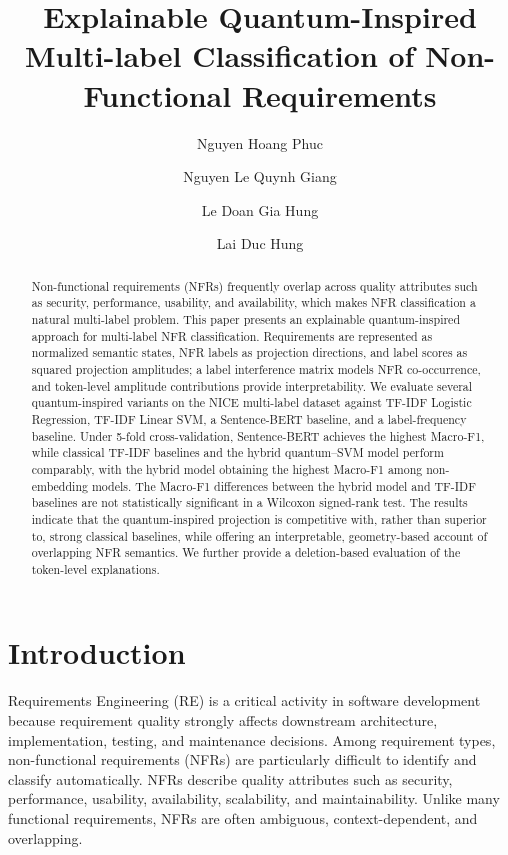 \documentclass[runningheads]{llncs}
\title{Explainable Quantum-Inspired Multi-label Classification of Non-Functional Requirements}
\author{Nguyen Hoang Phuc\inst{1} \and Nguyen Le Quynh Giang\inst{1} \and Le Doan Gia Hung\inst{1} \and Lai Duc Hung\inst{1}}
\institute{FPT University, Ho Chi Minh City, Vietnam \\
\email{nphuc4748@gmail.com, nguyengiang14012005@gmail.com, lhung291005@gmail.com, hungld@fpt.edu.vn}}
\begin{document}
\maketitle

\begin{abstract}
Non-functional requirements (NFRs) frequently overlap across quality attributes
such as security, performance, usability, and availability, which makes NFR
classification a natural multi-label problem. This paper presents an explainable
quantum-inspired approach for multi-label NFR classification. Requirements are
represented as normalized semantic states, NFR labels as projection directions,
and label scores as squared projection amplitudes; a label interference matrix
models NFR co-occurrence, and token-level amplitude contributions provide
interpretability. We evaluate several quantum-inspired variants on the NICE
multi-label dataset against TF-IDF Logistic Regression, TF-IDF Linear SVM, a
Sentence-BERT baseline, and a label-frequency baseline. Under 5-fold
cross-validation, Sentence-BERT achieves the highest Macro-F1, while classical
TF-IDF baselines and the hybrid quantum--SVM model perform comparably, with
the hybrid model obtaining the highest Macro-F1 among non-embedding models.
The Macro-F1 differences between the hybrid model and TF-IDF baselines are not
statistically significant in a Wilcoxon signed-rank test. The results indicate
that the quantum-inspired projection is competitive with, rather than superior
to, strong classical baselines, while offering an interpretable, geometry-based
account of overlapping NFR semantics. We further provide a deletion-based
evaluation of the token-level explanations.
\end{abstract}

\section{Introduction}
Requirements Engineering (RE) is a critical activity in software development
because requirement quality strongly affects downstream architecture,
implementation, testing, and maintenance decisions. Among requirement types,
non-functional requirements (NFRs) are particularly difficult to identify and
classify automatically. NFRs describe quality attributes such as security,
performance, usability, availability, scalability, and maintainability. Unlike
many functional requirements, NFRs are often ambiguous, context-dependent, and
overlapping.
\end{document}
